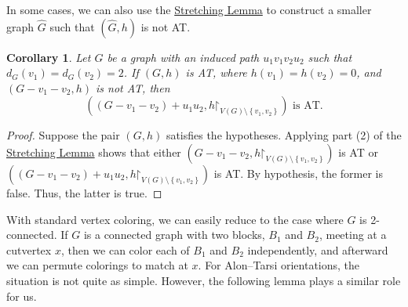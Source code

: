 \documentclass[12pt]{article}
\theoremstyle{plain}
\newtheorem{cor}[thm]{Corollary}
\theoremstyle{definition}
\theoremstyle{remark}
\newcommand{\set}[1]{\left\{ #1 \right\}}
\newcommand{\parens}[1]{\left( #1 \right)}
\renewcommand{\restriction}{\mathord{\upharpoonright}}
\begin{document}
In some cases, we can also use the \hyperref[SubdivideTwice]{Stretching Lemma} to construct a smaller graph
$\widehat{G}$ such that $(\widehat{G},h)$ is not AT.
\begin{cor}\label{ReduceP4Cor}
Let $G$ be a graph with an induced path $u_1v_1v_2u_2$ such that $d_G(v_1) =
d_G(v_2) = 2$.  If $(G,h)$ is AT, where $h(v_1) = h(v_2) = 0$, and
$(G-v_1-v_2,h)$ is not AT, then \[\parens{(G - v_1 - v_2) + u_1u_2,
h\restriction_{V(G) \setminus \set{v_1, v_2}}} \text{ is AT.}\]
\end{cor}
\begin{proof}
Suppose the pair $(G,h)$ satisfies the hypotheses.
Applying part (2) of the \hyperref[SubdivideTwice]{Stretching Lemma} shows that either $\parens{G - v_1
- v_2, h\restriction_{V(G) \setminus \set{v_1, v_2}}}$ is AT or $\parens{(G -
v_1 - v_2) + u_1u_2, h\restriction_{V(G) \setminus \set{v_1, v_2}}}$ is AT. 
By hypothesis, the former is false.  Thus, the latter is true.
\end{proof}

With standard vertex coloring, we can easily reduce to the case where $G$ is
2-connected.  If $G$ is a connected graph with two blocks, $B_1$ and $B_2$,
meeting at a cutvertex $x$, then we can color each of $B_1$ and $B_2$
independently, and afterward we can permute colorings to match at $x$.
For Alon--Tarsi orientations, the situation is not quite as simple.  However,
the following lemma plays a similar role for us.
\end{document}
